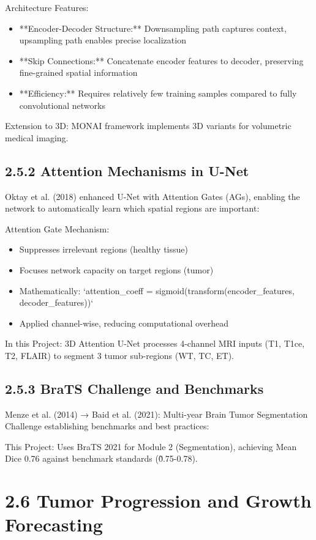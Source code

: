 Architecture Features:

\begin{itemize}
  \item **Encoder-Decoder Structure:** Downsampling path captures context, upsampling path enables precise localization
  \item **Skip Connections:** Concatenate encoder features to decoder, preserving fine-grained spatial information
  \item **Efficiency:** Requires relatively few training samples compared to fully convolutional networks
\end{itemize}

Extension to 3D: MONAI framework implements 3D variants for volumetric medical imaging.


\subsection{2.5.2 Attention Mechanisms in U-Net}
Oktay et al. (2018) enhanced U-Net with Attention Gates (AGs), enabling the network to automatically learn which spatial regions are important:

Attention Gate Mechanism:

\begin{itemize}
  \item Suppresses irrelevant regions (healthy tissue)
  \item Focuses network capacity on target regions (tumor)
  \item Mathematically: `attention\_coeff = sigmoid(transform(encoder\_features, decoder\_features))`
  \item Applied channel-wise, reducing computational overhead
\end{itemize}

In this Project: 3D Attention U-Net processes 4-channel MRI inputs (T1, T1ce, T2, FLAIR) to segment 3 tumor sub-regions (WT, TC, ET).


\subsection{2.5.3 BraTS Challenge and Benchmarks}
Menze et al. (2014) → Baid et al. (2021): Multi-year Brain Tumor Segmentation Challenge establishing benchmarks and best practices:

This Project: Uses BraTS 2021 for Module 2 (Segmentation), achieving Mean Dice 0.76 against benchmark standards (\~0.75-0.78).


\section{2.6 Tumor Progression and Growth Forecasting}

